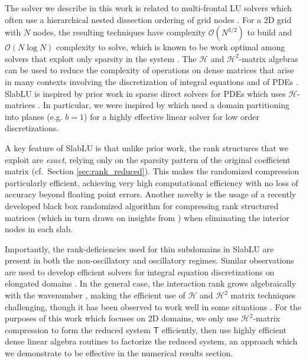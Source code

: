 \documentclass[10pt,a4paper]{amsart}
\newcommand{\mtx}[1]{\bm{\mathsf{#1}}}
\begin{document}
The solver we describe in this work is related to multi-frontal LU solvers \cite{2016_acta_sparse_direct_survey}
which often use a hierarchical nested dissection ordering of grid nodes \cite{amestoy1996approximate,george_1973}.
For a 2D grid with $N$ nodes,
the resulting techniques have complexity $\mathcal O(N^{3/2})$ to build and $\mathcal O(N\log N)$ complexity to solve, which is known
to be work optimal among solvers that exploit only sparsity in the system 
\cite{2006_davis_directsolverbook,1989_directbook_duff}. 
The $\mathcal H$ and $\mathcal H^2$-matrix algebras can be used to reduce the complexity of operations on dense matrices that arise in 
many contexts involving the discretization of integral equations and of PDEs \cite{2008_bebendorf_book,2003_borm_introduction_H_matrix,hackbusch2015hierarchical}. 
SlabLU is inspired by prior work in sparse direct solvers for PDEs which uses $\mathcal H$-matrices \cite{amestoy2017complexity,2018_chavez_accelerated,2016_ghysels_randomized_multifrontal,2009_xia_superfast,gillman2014direct,2017_pichon_sparse}. In particular, we were inspired by \cite{2018_chavez_accelerated}
which used a domain partitioning into planes (e.g. $b=1$) for a highly effective linear solver for low order discretizations.

A key feature of SlabLU is that unlike prior work, the rank structures that we exploit are \textit{exact}, relying only on the sparsity pattern of the original coefficient matrix (cf.~Section \ref{sec:rank_reduced}).
This makes the randomized compression particularly efficient, achieving very high computational efficiency with no loss of accuracy beyond floating point errors. 
Another novelty is the usage of a recently developed black box randomized algorithm for compressing rank structured matrices \cite{levitt2022linear} (which in turn draws on insights from \cite{2011_lin_lu_ying,2016_martinsson_hudson2,2011_martinsson_randomhudson}) when eliminating the interior nodes in each slab.

Importantly, the rank-deficiencies used for thin subdomains in SlabLU are present in both the non-oscillatory and oscillatory regimes.
Similar observations are used to develop
efficient solvers for integral equation discretizations on elongated domains \cite{1996_mich_elongated,2007_martinsson_elongated}.
In the general case, the interaction rank grows algebraically with the
wavenumber \cite{engquist2018approximate}, making the efficient use of $\mathcal H$ and $\mathcal H^2$ matrix techniques challenging, though it has been observed to work well in some situations \cite{banjai2008hierarchical,betcke2017computationally,2011_xia_dehoop}. For the purposes of this work which focuses on 2D domains, 
we only use $\mathcal H^2$-matrix compression to form the reduced system $\mtx T$ efficiently,
then use highly efficient dense linear algebra routines to factorize the reduced system, an approach which we demonstrate to be effective
in the numerical results section.
\end{document}
